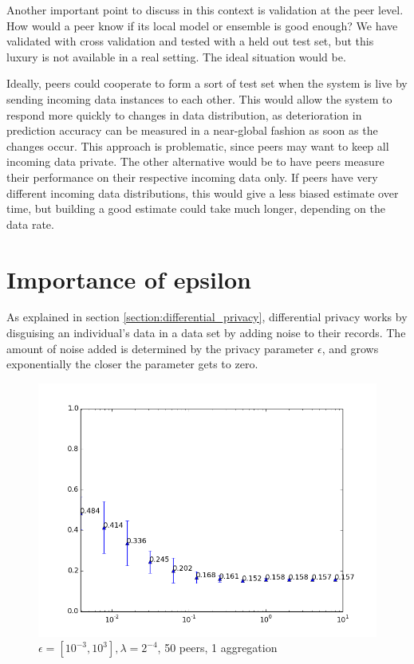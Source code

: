 Another important point to discuss in this context is validation at the peer level. How would a peer know if its local model or ensemble is good enough? We have validated with cross validation and tested with a held out test set, but this luxury is not available in a real setting. The ideal situation would be. 

Ideally, peers could cooperate to form a sort of test set when the system is live by sending incoming data instances to each other. This would allow the system to respond more quickly to changes in data distribution, as deterioration in prediction accuracy can be measured in a near-global fashion as soon as the changes occur. This approach is problematic, since peers may want to keep all incoming data private. The other alternative would be to have peers measure their performance on their respective incoming data only. If peers have very different incoming data distributions, this would give a less biased estimate over time, but building a good estimate could take much longer, depending on the data rate.



\section{Importance of epsilon}
As explained in section \ref{section:differential_privacy}, differential privacy works by disguising an individual's data in a data set by adding noise to their records. The amount of noise added is determined by the privacy parameter  $\epsilon$, and grows exponentially the closer the parameter gets to zero. 

\begin{figure}[H]
	\centering
	\includegraphics[width=\textwidth]{fig/spambase/eps2e-8-2e8,budg=eps,peers10,groups10,reg2e-2-data368-pubAll-spam-baseline-testset}
 	\caption{$\epsilon = [10^{-3}, 10^{3}], \lambda = 2^{-4}$, 50 peers, 1 aggregation}
 	\label{fig:epsilon_big_range}
\end{figure}
 
